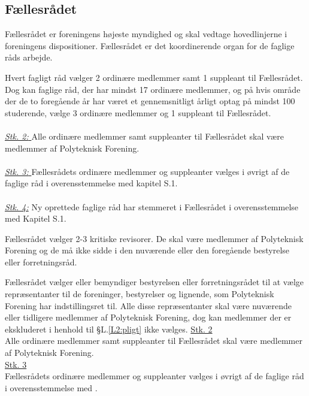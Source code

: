\begin{list}
\subsection{Fællesrådet}
\label{L:kap:faellesraadet}
\item Fællesrådet er foreningens højeste myndighed og skal vedtage hovedlinjerne i foreningens dispositioner. Fællesrådet er det koordinerende organ for de faglige råds arbejde.

\item \label{L:FR:ValgtilFR} Hvert fagligt råd vælger 2 ordinære medlemmer samt 1 suppleant til Fællesrådet. Dog kan faglige råd, der har mindst 17 ordinære medlemmer, og på hvis område der de to foregående år har været et gennemsnitligt årligt optag på mindst 100 studerende, vælge 3 ordinære medlemmer og 1 suppleant til Fællesrådet.\\
\\
\underline{\textit{Stk. 2: }} Alle ordinære medlemmer samt suppleanter til Fællesrådet skal være medlemmer af Polyteknisk Forening.\\
\\
\underline{\textit{Stk. 3: }} Fællesrådets ordinære medlemmer og suppleanter vælges i øvrigt af de faglige råd i overensstemmelse med kapitel S.1.
\\
\\
\underline{\textit{Stk. 4:}} Ny oprettede faglige råd har stemmeret i Fællesrådet i overensstemmelse med Kapitel S.1.

\item Fællesrådet vælger 2-3 kritiske revisorer. De skal være medlemmer af Polyteknisk Forening og de må ikke sidde i den nuværende eller den foregående bestyrelse eller forretningsråd. 

\item Fællesrådet vælger eller bemyndiger bestyrelsen eller forretningsrådet til at vælge repræsentanter til de foreninger, bestyrelser og lignende, som Polyteknisk Forening har indstillingsret til. Alle disse repræsentanter skal være nuværende eller tidligere medlemmer af Polyteknisk Forening, dog kan medlemmer der er ekskluderet i henhold til §L.\ref{L2:pligt} ikke vælges.
\underline{Stk. 2}\\
Alle ordinære medlemmer samt suppleanter til Fællesrådet skal være medlemmer af Polyteknisk Forening.\\

\underline{Stk. 3}\\
Fællesrådets ordinære medlemmer og suppleanter vælges i øvrigt af de faglige råd i overensstemmelse med .\\


\end{list}
